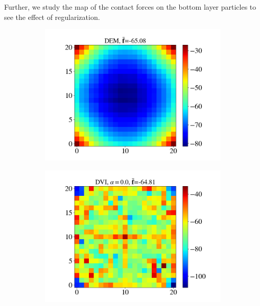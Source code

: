\begin{itemize}
	
	Further, we study the map of the contact forces on the bottom layer particles to see the effect of regularization. 
	\begin{figure}[H]
		\centering	
		\begin{subfigure}{0.32\columnwidth}	
			\centering
			\includegraphics[width=1.0\textwidth]{images/CD/Example7/20/N_21_DEM_0.png}
		\end{subfigure}
		\begin{subfigure}{0.32\columnwidth}	
			\centering
			\includegraphics[width=1.0\textwidth]{images/CD/Example7/20/N_21_DVI_0.0.png}
		\end{subfigure}
		\begin{subfigure}{0.32\columnwidth}	
			\centering

\end{subfigure}
\end{figure}
\end{itemize}
